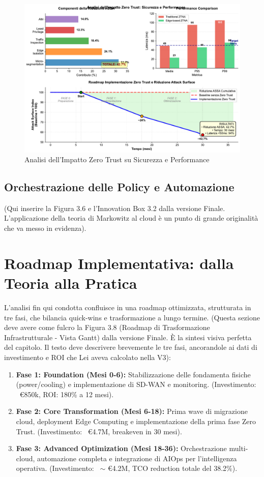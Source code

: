 \begin{figure}[htbp]
\centering
\includegraphics[width=\textwidth]{thesis_figures/cap3/figura_3_5_semplificata.pdf}
\caption{Analisi dell'Impatto Zero Trust su Sicurezza e Performance}
\label{fig:zero_trust_impact}
\end{figure}
\subsection{Orchestrazione delle Policy e Automazione}



(Qui inserire la Figura 3.6 e l'Innovation Box 3.2 dalla versione Finale. L'applicazione della teoria di Markowitz al cloud è un punto di grande originalità che va messo in evidenza).
\section{ Roadmap Implementativa: dalla Teoria alla Pratica}
L'analisi fin qui condotta confluisce in una roadmap ottimizzata, strutturata in tre fasi\autocite{Capgemini2024}, che bilancia quick-wins e trasformazione a lungo termine.\autocite{Vose2008}
(Questa sezione deve avere come fulcro la Figura 3.8 (Roadmap di Trasformazione Infrastrutturale - Vista Gantt) dalla versione Finale. È la sintesi visiva perfetta del capitolo. Il testo deve descrivere brevemente le tre fasi, ancorandole ai dati di investimento e ROI che Lei aveva calcolato nella V3):
\begin{enumerate}
    \item \textbf{Fase 1: Foundation (Mesi 0-6):} Stabilizzazione delle fondamenta fisiche (power/cooling) e implementazione di SD-WAN e monitoring. (Investimento: ~€850k, ROI: 180\% a 12 mesi).
    \item \textbf{Fase 2: Core Transformation (Mesi 6-18):} Prima wave di migrazione cloud, deployment Edge Computing e implementazione della prima fase Zero Trust. (Investimento: ~€4.7M, breakeven in 30 mesi).
    \item \textbf{Fase 3: Advanced Optimization (Mesi 18-36):} Orchestrazione multi-cloud, automazione completa e integrazione di AIOps per l'intelligenza operativa. (Investimento: ~$\sim$ €4.2M, TCO reduction totale del 38.2\%).
\end{enumerate}

